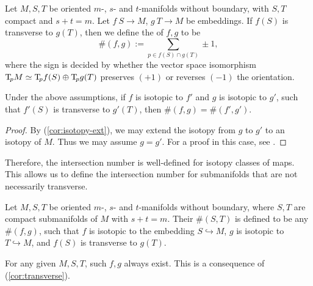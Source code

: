 \begin{definition}
Let $M,S,T$ be oriented $m$-, $s$- and $t$-manifolds without boundary,
with $S,T$ compact and $s+t=m$.
Let $f\:S\to M$, $g\:T\to M$ be embeddings.
If $f(S)$ is transverse to $g(T)$, then we define the
 of $f,g$ to be
\[\#(f,g):=\sum_{p\in f(S)\cap g(T)}\pm1,\]
where the sign is decided by whether the vector space isomorphism
$\mathrm{T}\!_pM\simeq\mathrm{T}\!_pf(S)\oplus\mathrm{T}\!_pg(T)$
preserves $(+1)$ or reverses $(-1)$ the orientation. \varqed
\end{definition}

\begin{proposition}
Under the above assumptions, if $f$ is isotopic to $f'$ and $g$ is isotopic to $g'$,
such that $f'(S)$ is transverse to $g'(T)$, then $\#(f,g)=\#(f',g')$.
\end{proposition}

\begin{proof}
By (\ref{cor:isotopy-ext}), we may extend the isotopy from $g$ to $g'$ to an isotopy of $M$.
Thus we may assume $g=g'$.
For a proof in this case, see \cite[p.\,108]{gp}. 
\end{proof}

Therefore, the intersection number is well-defined for isotopy classes of maps.
This allows us to define the intersection number for submanifolds
that are not necessarily transverse.

\begin{definition}
Let $M,S,T$ be oriented $m$-, $s$- and $t$-manifolds without boundary,
where $S,T$ are compact submanifolds of $M$ with $s+t=m$.
Their  $\#(S,T)$
is defined to be any $\#(f,g)$, such that $f$ is isotopic to the embedding $S\hookrightarrow M$,
$g$ is isotopic to $T\hookrightarrow M$, and $f(S)$ is transverse to $g(T)$. \varqed
\end{definition}

For any given $M,S,T$, such $f,g$ always exist.
This is a consequence of (\ref{cor:transverse}). 

